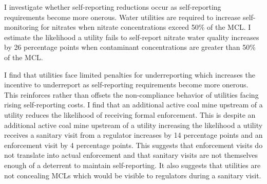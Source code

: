 \documentclass{article}
\begin{document}
I investigate whether self-reporting reductions occur as self-reporting requirements become more onerous. Water utilities are required to increase self-monitoring for nitrates when nitrate concentrations exceed 50\% of the MCL. I estimate the likelihood a utility fails to self-report nitrate water quality increases by 26 percentage points when contaminant concentrations are greater than 50\% of the MCL.

I find that utilities face limited penalties for underreporting which increases the incentive to underreport as self-reporting requirements become more onerous. This reinforces rather than offsets the non-compliance behavior of utilities facing rising self-reporting costs. I find that an additional active coal mine upstream of a utility reduces the likelihood of receiving formal enforcement. This is despite an additional active coal mine upstream of a utility increasing the likelihood a utility receives a sanitary visit from a regulator increases by 14 percentage points and an enforcement visit by 4 percentage points. This suggests that enforcement visits do not translate into actual enforcement and that sanitary visits are not themselves enough of a deterrent to maintain self-reporting. It also suggests that utilities are not concealing MCLs which would be visible to regulators during a sanitary visit.


\end{document}
